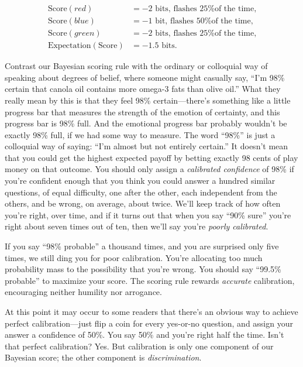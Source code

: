 \begin{align*}
 \text{Score}(red) &= -2 \text{ bits, flashes 25\% of the time,}\\
 \text{Score}(blue) &= -1 \text{ bit, flashes 50\% of the time,}\\
 \text{Score}(green) &= -2 \text{ bits, flashes 25\% of the time,} \\
 \text{Expectation}(\text{Score}) &= -1.5 \text{ bits.}
\end{align*}

{
 Contrast our Bayesian scoring rule with the ordinary or colloquial
way of speaking about degrees of belief, where someone might casually
say, ``I'm 98\% certain that canola
oil contains more omega-3 fats than olive oil.'' What
they really mean by this is that they feel 98\%
certain---there's something like a little progress bar
that measures the strength of the emotion of certainty, and this
progress bar is 98\% full. And the emotional progress bar probably
wouldn't be exactly 98\% full, if we had some way to
measure. The word ``98\%'' is just a
colloquial way of saying: ``I'm almost
but not entirely certain.'' It
doesn't mean that you could get the highest expected
payoff by betting exactly 98 cents of play money on that outcome. You
should only assign a \textit{calibrated confidence} of 98\% if
you're confident enough that you think you could answer
a hundred similar questions, of equal difficulty, one after the other,
each independent from the others, and be wrong, on average, about
twice. We'll keep track of how often
you're right, over time, and if it turns out that when
you say ``90\% sure''
you're right about seven times out of ten, then
we'll say you're \textit{poorly
calibrated}.}

{
 If you say ``98\% probable'' a
thousand times, and you are surprised only five times, we still ding
you for poor calibration. You're allocating too much
probability mass to the possibility that you're wrong.
You should say ``99.5\% probable''
to maximize your score. The scoring rule rewards \textit{accurate}
calibration, encouraging neither humility nor arrogance.}

{
 At this point it may occur to some readers that
there's an obvious way to achieve perfect
calibration---just flip a coin for every yes-or-no question, and assign
your answer a confidence of 50\%. You say 50\% and
you're right half the time. Isn't that
perfect calibration? Yes. But calibration is only one component of our
Bayesian score; the other component is \textit{discrimination}.}


